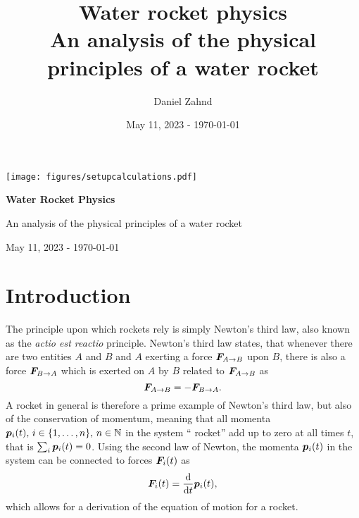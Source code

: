 \documentclass[a4paper,11pt]{report}
\author{Daniel Zahnd}
\date{May 11, 2023 - \today}
\title{Water rocket physics \\ \vspace{0.5cm} \normalsize An analysis of the physical principles of a water rocket}
\begin{document}
\begin{titlepage}
    
    \centering
    
    \texttt{[image: figures/setupcalculations.pdf]} %
    
    \vspace{2cm}
    
    \Huge
    \textbf{Water Rocket Physics}
    
    \vspace{0.5cm}
    
    \normalsize
    An analysis of the physical principles of a water rocket
    
    \vspace{3cm}
    
    \Large
    
    \vfill
    
    \large
    May 11, 2023 - \today %
    
\end{titlepage}



\newpage
{}
\tableofcontents
\FloatBarrier
\newpage
{}
\setcounter{page}{1}

\chapter{Introduction}
The principle upon which rockets rely is simply Newton's third law, also known as the \textit{actio est reactio} principle. Newton's third law states, that whenever there are two entities $A$ and $B$ and $A$ exerting a force $\bm{F}_{A\rightarrow B}$ upon $B$, there is also a force $\bm{F}_{B\rightarrow A}$ which is exerted on $A$ by $B$ related to $\bm{F}_{A\rightarrow B}$ as \begin{equation}
\bm{F}_{A\rightarrow B} = -\bm{F}_{B\rightarrow A}.
\end{equation} A rocket in general is therefore a prime example of Newton's third law, but also of the conservation of momentum, meaning that all momenta $\bm{p}_i(t),\,i\in\{1,\dots,n\},\,n\in\mathbb{N}$ in the system `` rocket'' add up to zero at all times $t$, that is 
$\sum_i \bm{p}_i(t) = 0$. Using the second law of Newton, the momenta $\bm{p}_i(t)$ in the system can be connected to forces $\bm{F}_i(t)$ as \begin{equation}
\bm{F}_i(t) = \frac{\mathrm{d}}{\mathrm{d}t}\bm{p}_i(t),
\end{equation} which allows for a derivation of the equation of motion for a rocket.
\end{document}
